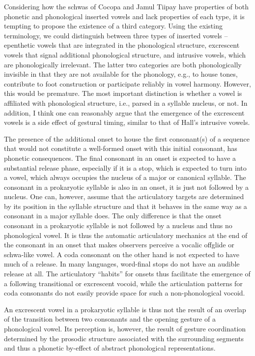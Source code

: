 \documentclass[output=paper,colorlinks,citecolor=brown]{langscibook}
\begin{document}
Considering how the schwas of Cocopa and Jamul Tiipay have properties of both phonetic and phonological inserted vowels and lack properties of each type, it is tempting to propose the existence of a third category. Using the existing terminology, we could distinguish between three types of inserted vowels – epenthetic vowels that are integrated in the phonological structure, excrescent vowels that signal additional phonological structure, and intrusive vowels, which are phonologically irrelevant. The latter two categories are both phonologically invisible in that they are not available for the phonology, e.g., to house tones, contribute to foot construction or participate reliably in vowel harmony. However, this would be premature. The most important distinction is whether a vowel is affiliated with phonological structure, i.e., parsed in a syllable nucleus, or not. In addition, I think one can reasonably argue that the emergence of the excrescent vowels is a side effect of gestural timing, similar to that of Hall’s intrusive vowels.

The presence of the additional onset to house the first consonant(s) of a sequence that would not constitute a well-formed onset with this initial consonant, has phonetic consequences. The final consonant in an onset is expected to have a substantial release phase, especially if it is a stop, which is expected to turn into a vowel, which always occupies the nucleus of a major or canonical syllable. The consonant in a prokaryotic syllable is also in an onset, it is just not followed by a nucleus. One can, however, assume that the articulatory targets are determined by its position in the syllable structure and that it behaves in the same way as a consonant in a major syllable does. The only difference is that the onset consonant in a prokaryotic syllable is not followed by a nucleus and thus no phonological vowel. It is thus the automatic articulatory mechanics at the end of the consonant in an onset that makes observers perceive a vocalic offglide or schwa-like vowel. A coda consonant on the other hand is not expected to have much of a release. In many languages, word-final stops do not have an audible release at all. The articulatory “habits” for onsets thus facilitate the emergence of a following transitional or excrescent vocoid, while the articulation patterns for coda consonants do not easily provide space for such a non-phonological vocoid. 

An excrescent vowel in a prokaryotic syllable is thus not the result of an overlap of the transition between two consonants and the opening gesture of a phonological vowel. Its perception is, however, the result of gesture coordination determined by the prosodic structure associated with the surrounding segments and thus a phonetic by-effect of abstract phonological representations.
\end{document}
